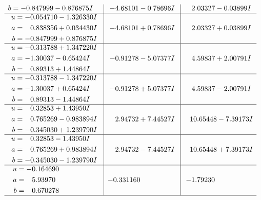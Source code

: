 \documentclass[1p]{elsarticle_modified}
\theoremstyle{definition}
\begin{document}
$$\begin{array}{c|c|c}
\begin{aligned}
b &= -0.847999 - 0.876875 I\end{aligned}
 & -4.68101 - 0.78696 I & \phantom{-}2.03327 - 0.03899 I \\ \hline\begin{aligned}
u &= -0.054710 - 1.326330 I \\
a &= \phantom{-}0.838356 + 0.034430 I \\
b &= -0.847999 + 0.876875 I\end{aligned}
 & -4.68101 + 0.78696 I & \phantom{-}2.03327 + 0.03899 I \\ \hline\begin{aligned}
u &= -0.313788 + 1.347220 I \\
a &= -1.30037 - 0.65424 I \\
b &= \phantom{-}0.89313 + 1.44864 I\end{aligned}
 & -0.91278 - 5.07377 I & \phantom{-}4.59837 + 2.00791 I \\ \hline\begin{aligned}
u &= -0.313788 - 1.347220 I \\
a &= -1.30037 + 0.65424 I \\
b &= \phantom{-}0.89313 - 1.44864 I\end{aligned}
 & -0.91278 + 5.07377 I & \phantom{-}4.59837 - 2.00791 I \\ \hline\begin{aligned}
u &= \phantom{-}0.32853 + 1.43950 I \\
a &= \phantom{-}0.765269 - 0.983894 I \\
b &= -0.345030 + 1.239790 I\end{aligned}
 & \phantom{-}2.94732 + 7.44527 I & \phantom{-}10.65448 - 7.39173 I \\ \hline\begin{aligned}
u &= \phantom{-}0.32853 - 1.43950 I \\
a &= \phantom{-}0.765269 + 0.983894 I \\
b &= -0.345030 - 1.239790 I\end{aligned}
 & \phantom{-}2.94732 - 7.44527 I & \phantom{-}10.65448 + 7.39173 I \\ \hline\begin{aligned}
u &= -0.164690\phantom{ +0.000000I} \\
a &= \phantom{-}5.93970\phantom{ +0.000000I} \\
b &= \phantom{-}0.670278\phantom{ +0.000000I}\end{aligned}
 & -0.331160\phantom{ +0.000000I} & -1.79230\phantom{ +0.000000I}\\
 \hline 
 \end{array}$$\newpage
\end{document}
